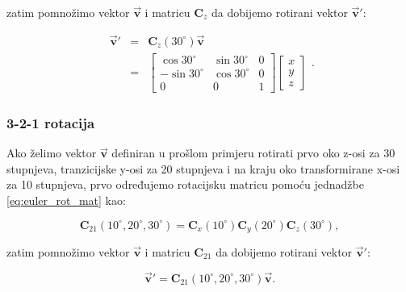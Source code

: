 \documentclass[times, utf8, diplomski, numeric]{templates/template}
\begin{document}
{{{{                zatim pomnožimo vektor $\overrightarrow{\boldsymbol{v}}$ i matricu $\boldsymbol{C}_{z}$ da dobijemo rotirani vektor $\overrightarrow{\boldsymbol{v}}'$:

                \begin{equation}
                \begin{array}{rcl}
                    \overrightarrow{\boldsymbol{v}}' & = & \boldsymbol{C}_{z}(30^{\circ}) \overrightarrow{\boldsymbol{v}} \\
                    & = &
                \begin{bmatrix}
                    \cos30^{\circ}   & \sin30^{\circ}    &  0 \\
                    -\sin30^{\circ}  & \cos30^{\circ}    &  0 \\
                    0                & 0                 &  1
                \end{bmatrix}
                \begin{bmatrix}
                    x \\
                    y \\
                    z
                \end{bmatrix}
                \end{array}
                .
                \end{equation}
            }

            \subsubsection{3-2-1 rotacija}{
                Ako želimo vektor $\overrightarrow{\boldsymbol{v}}$ definiran u prošlom primjeru rotirati prvo oko z-osi za 30 stupnjeva, tranzicijske y-osi za 20 stupnjeva i na kraju oko transformirane x-osi za 10 stupnjeva, prvo određujemo rotacijsku matricu pomoću jednadžbe \ref{eq:euler_rot_mat} kao:

                \begin{equation}
                \boldsymbol{C}_{21}(10^\circ, 20^\circ, 30^\circ) = \boldsymbol{C}_{x}(10^\circ) \boldsymbol{C}_{y}(20^\circ) \boldsymbol{C}_{z}(30^\circ),
                \end{equation}

                zatim pomnožimo vektor $\overrightarrow{\boldsymbol{v}}$ i matricu $\boldsymbol{C}_{21}$ da dobijemo rotirani vektor $\overrightarrow{\boldsymbol{v}}'$:

                \begin{equation}
                    \overrightarrow{\boldsymbol{v}}' = \boldsymbol{C}_{21}(10^\circ, 20^\circ, 30^\circ) \overrightarrow{\boldsymbol{v}}.
                \end{equation}
            }
        }
    }

}
\end{document}

